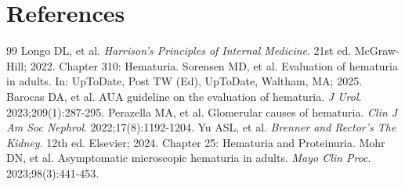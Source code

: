 \section*{References}

\begin{thebibliography}{99}
 Longo DL, et al. \emph{Harrison's Principles of Internal Medicine}. 21st ed. McGraw-Hill; 2022. Chapter 310: Hematuria.
 Sorensen MD, et al. Evaluation of hematuria in adults. In: UpToDate, Post TW (Ed), UpToDate, Waltham, MA; 2025.
 Barocas DA, et al. AUA guideline on the evaluation of hematuria. \emph{J Urol}. 2023;209(1):287-295.
 Perazella MA, et al. Glomerular causes of hematuria. \emph{Clin J Am Soc Nephrol}. 2022;17(8):1192-1204.
 Yu ASL, et al. \emph{Brenner and Rector's The Kidney}. 12th ed. Elsevier; 2024. Chapter 25: Hematuria and Proteinuria.
 Mohr DN, et al. Asymptomatic microscopic hematuria in adults. \emph{Mayo Clin Proc}. 2023;98(3):441-453.
\end{thebibliography}
